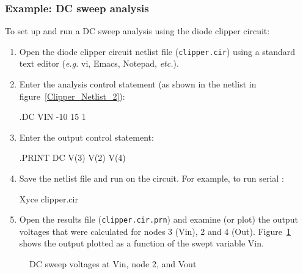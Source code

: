 \subsubsection{Example: DC sweep analysis}
To set up and run a DC sweep analysis using the diode clipper circuit:
\begin{enumerate}
\item Open the diode clipper circuit netlist file (\texttt{clipper.cir}) 
using a standard text editor (\emph{e.g.\/} vi, Emacs, Notepad, \emph{etc.\/}).
\item Enter the analysis control statement (as shown in the netlist in figure~\ref{Clipper_Netlist_2}):
\begin{vquote}
.DC VIN -10 15 1
\end{vquote}
\item Enter the output control statement:
\begin{vquote}
.PRINT DC V(3) V(2) V(4)
\end{vquote}
\item Save the netlist file and run \Xyce{} on the circuit. For example, to run
  serial \Xyce{}:
\begin{vquote}
 Xyce clipper.cir
\end{vquote}
\item Open the results file (\texttt{clipper.cir.prn}) and examine (or plot) the 
  output voltages that were calculated for nodes 3 (Vin), 2 and 4 (Out).
  Figure~\ref{Clipper_DCSweep} shows the output plotted as a function of the
  swept variable Vin.
\end{enumerate}

\begin{figure}[H]
\begin{centering}
\caption{DC sweep voltages at Vin, node 2, and Vout\label{Clipper_DCSweep}}
\end{centering}
\end{figure}

